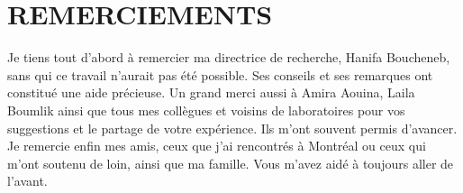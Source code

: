 %
\chapter*{REMERCIEMENTS}\thispagestyle{headings}
%
Je tiens tout d'abord à remercier ma directrice de recherche, Hanifa Boucheneb,
sans qui ce travail n'aurait pas été possible. Ses conseils et ses remarques ont
constitué une aide précieuse. Un grand merci aussi à Amira Aouina, Laila
Boumlik ainsi que tous mes collègues et voisins de laboratoires pour vos
suggestions et le partage de votre expérience. Ils m'ont souvent permis
d'avancer. Je remercie enfin mes amis, ceux que j'ai rencontrés à Montréal ou
ceux qui m'ont soutenu de loin, ainsi que ma famille. Vous m'avez aidé à
toujours aller de l'avant.